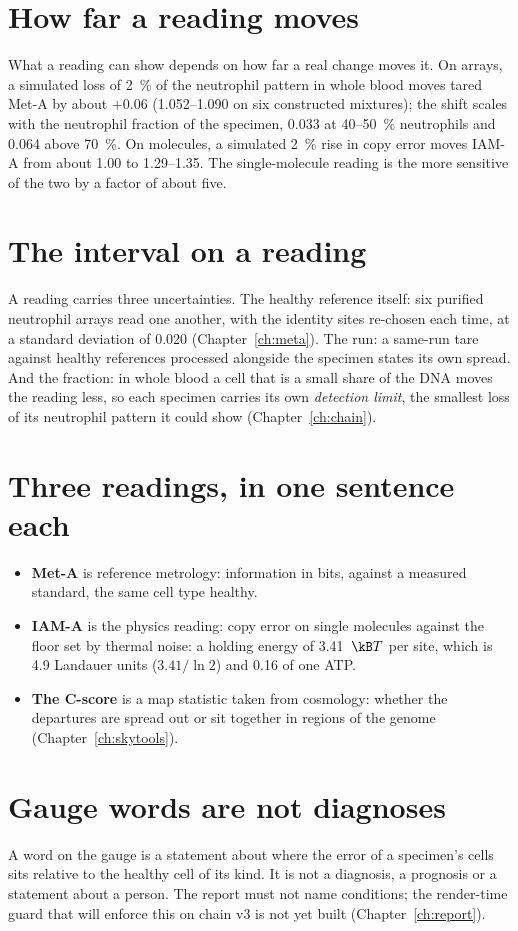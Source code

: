 \section{How far a reading moves}

What a reading can show depends on how far a real change moves it. On arrays, a simulated loss of 2~\% of the neutrophil
pattern in whole blood moves tared Met-A by about $+0.06$ (1.052--1.090 on six constructed mixtures); the shift scales with
the neutrophil fraction of the specimen, 0.033 at 40--50~\% neutrophils and 0.064 above 70~\%.
\measured{} On molecules, a simulated 2~\% rise in copy error moves IAM-A from about 1.00 to 1.29--1.35. \measured{} The
single-molecule reading is the more sensitive of the two by a factor of about five.

\section{The interval on a reading}

A reading carries three uncertainties. The healthy reference itself: six purified neutrophil arrays read one another, with
the identity sites re-chosen each time, at a standard deviation of 0.020 (Chapter~\ref{ch:meta}). The run: a same-run tare
against healthy references processed alongside the specimen states its own spread. And the fraction: in whole blood a cell
that is a small share of the DNA moves the reading less, so each specimen carries its own \emph{detection limit}, the
smallest loss of its neutrophil pattern it could show (Chapter~\ref{ch:chain}). \measured

\section{Three readings, in one sentence each}
\begin{itemize}
\item \textbf{Met-A} is reference metrology: information in bits, against a measured standard, the same cell type healthy.
\item \textbf{IAM-A} is the physics reading: copy error on single molecules against the floor set by thermal noise: a
holding energy of 3.41~$\kB T$ per site, which is 4.9 Landauer units ($3.41/\ln2$) and 0.16 of one ATP.
\item \textbf{The C-score} is a map statistic taken from cosmology: whether the departures are spread out or sit together in regions of the
genome (Chapter~\ref{ch:skytools}).
\end{itemize}

\section{Gauge words are not diagnoses}
\begin{rulebox}
A word on the gauge is a statement about where the error of a specimen's cells sits relative to the healthy cell of its kind. It
is not a diagnosis, a prognosis or a statement about a person. The report must not name conditions; the render-time guard that will enforce this on chain v3 is not yet built (Chapter~\ref{ch:report}).
\end{rulebox}
